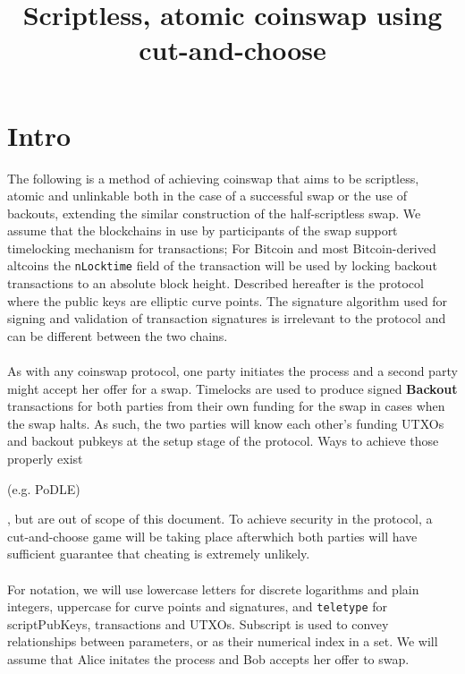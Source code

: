 \documentclass[12pt,a4paper]{article}
\title{Scriptless, atomic coinswap using cut-and-choose}
\date{}
\begin{document}
\maketitle
\section{Intro}
The following is a method of achieving coinswap that aims to be scriptless, atomic and unlinkable both in the case of a successful swap or the use of backouts, extending the similar construction of the half-scriptless swap\cite{hss}.  We assume that the blockchains in use by participants of the swap support timelocking mechanism for transactions; For Bitcoin and most Bitcoin-derived altcoins the \texttt{nLocktime} field of the transaction will be used by locking backout transactions to an absolute block height.  Described hereafter is the protocol where the public keys are elliptic curve points.  The signature algorithm used for signing and validation of transaction signatures is irrelevant to the protocol and can be different between the two chains.
\\
\\
As with any coinswap protocol, one party initiates the process and a second party might accept her offer for a swap.  Timelocks are used to produce signed \textbf{Backout} transactions for both parties from their own funding for the swap in cases when the swap halts.  As such, the two parties will know each other's funding UTXOs and backout pubkeys at the setup stage of the protocol.  Ways to achieve those properly exist \begin{tiny}(e.g. PoDLE)\end{tiny}, but are out of scope of this document.  To achieve security in the protocol, a cut-and-choose \cite{cnc} game will be taking place afterwhich both parties will have sufficient guarantee that cheating is extremely unlikely.
\\
\\
For notation, we will use lowercase letters for discrete logarithms and plain integers, uppercase for curve points and signatures, and \texttt{teletype} for scriptPubKeys, transactions and UTXOs.  Subscript is used to convey relationships between parameters, or as their numerical index in a set.
We will assume that Alice initates the process and Bob accepts her offer to swap.
\end{document}
